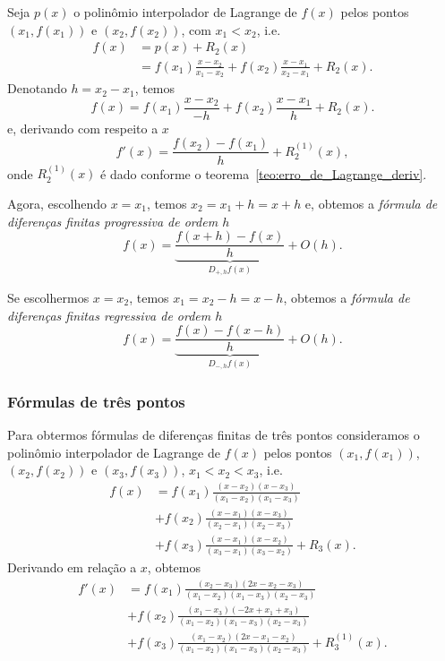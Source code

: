 Seja $p(x)$ o polinômio interpolador de Lagrange de $f(x)$ pelos pontos $(x_1, f(x_1))$ e $(x_2, f(x_2))$, com $x_1 < x_2$, i.e.
\begin{align}
  f(x) &= p(x) + R_{2}(x)\\
  &= f(x_1)\frac{x-x_2}{x_1-x_2} + f(x_2)\frac{x-x_1}{x_2-x_1} + R_2(x).
\end{align}
Denotando $h=x_2-x_1$, temos
\begin{equation}
  f(x) = f(x_1)\frac{x-x_2}{-h} + f(x_2)\frac{x-x_1}{h} + R_2(x).
\end{equation}
e, derivando com respeito a $x$
\begin{equation}
  f'(x) = \frac{f(x_2)-f(x_1)}{h} + R_2^{(1)}(x),
\end{equation}
onde $ R_2^{(1)}(x)$ é dado conforme o teorema~\ref{teo:erro_de_Lagrange_deriv}.

Agora, escolhendo $x=x_1$, temos $x_2 = x_1 + h = x + h$ e, obtemos a \emph{fórmula de diferenças finitas progressiva de ordem $h$}
\begin{equation}
  f(x) = \underbrace{\frac{f(x+h) - f(x)}{h}}_{D_{+,h}f(x)} + O(h).
\end{equation}

Se escolhermos $x=x_2$, temos $x_1 = x_2 - h = x - h$, obtemos a \emph{fórmula de diferenças finitas regressiva de ordem $h$}
\begin{equation}
  f(x) = \underbrace{\frac{f(x) - f(x-h)}{h}}_{D_{-,h}f(x)} + O(h).
\end{equation}

\subsubsection{Fórmulas de três pontos}

Para obtermos fórmulas de diferenças finitas de três pontos consideramos o polinômio interpolador de Lagrange de $f(x)$ pelos pontos $(x_1, f(x_1))$, $(x_2, f(x_2))$ e $(x_3, f(x_3))$, $x_1<x_2<x_3$, i.e.
\begin{align}
  f(x) &= f(x_1)\frac{(x-x_2)(x-x_3)}{(x_1-x_2)(x_1-x_3)} \\
  &+ f(x_2)\frac{(x-x_1)(x-x_3)}{(x_2-x_1)(x_2-x_3)} \\
  &+ f(x_3)\frac{(x-x_1)(x-x_2)}{(x_3-x_1)(x_3-x_2)} + R_3(x).
\end{align}
Derivando em relação a $x$, obtemos
\begin{align}\label{eq:aux_deriv1}
  f'(x) &= f{\left (x_{1} \right )}\frac{\left(x_{2} - x_{3}\right) \left(2 x- x_{2} - x_{3}\right)}{\left(x_{1} - x_{2}\right) \left(x_{1} - x_{3}\right) \left(x_{2} - x_{3}\right)} \\
  &+ f{\left (x_{2} \right )}\frac{\left(x_{1} - x_{3}\right) \left(- 2 x + x_{1} + x_{3}\right)}{\left(x_{1} - x_{2}\right) \left(x_{1} - x_{3}\right) \left(x_{2} - x_{3}\right)}\\
  &+ f\left(x_{3} \right)\frac{\left(x_{1} - x_{2}\right)\left(2 x - x_{1} - x_{2}\right)}{\left(x_{1} - x_{2}\right) \left(x_{1} - x_{3}\right) \left(x_{2} - x_{3}\right)} + R_3^{(1)}(x).
\end{align}


